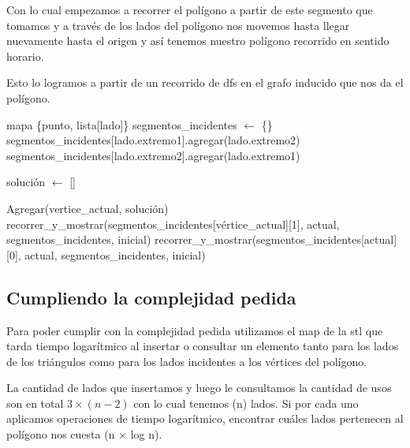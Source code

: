 Con lo cual empezamos a recorrer el polígono a partir de este segmento que tomamos y a través de los lados del polígono nos movemos hasta llegar nuevamente hasta el origen y así tenemos nuestro polígono recorrido en sentido horario.\newline    

Esto lo logramos a partir de un recorrido de dfs en el grafo inducido que nos da el polígono.\newline

\begin{algorithmic}

	\State mapa \{punto, lista[lado]\} segmentos_incidentes $\gets$ \{\}
		\State segmentos_incidentes[lado.extremo1].agregar(lado.extremo2)
		\State segmentos_incidentes[lado.extremo2].agregar(lado.extremo1)
	\EndFor 
\EndFunction
\end{algorithmic}


\begin{algorithmic}
\State solución $\gets$ []

	\State Agregar(vertice_actual, solución)
			\State recorrer_y_mostrar(segmentos_incidentes[vértice_actual][1], actual, segmentos_incidentes, inicial)
		\EndIf
	\Else
			\State recorrer_y_mostrar(segmentos_incidentes[actual][0], actual, segmentos_incidentes, inicial)
		\EndIf
	\EndIf
\EndFunction

\end{algorithmic}

\subsection{Cumpliendo la complejidad pedida}
Para poder cumplir con la complejidad pedida utilizamos el map de la stl que tarda tiempo logarítmico al insertar o consultar un elemento tanto para los lados de los triángulos como para los lados incidentes a los vértices del polígono.\newline

La cantidad de lados que insertamos y luego le consultamos la cantidad de usos son en total $3 \times (n-2)$ con lo cual tenemos \bigo(n) lados. Si por cada uno aplicamos operaciones de tiempo logarítmico, encontrar cuáles lados pertenecen al polígono nos cuesta \bigo(n $\times$ log n).\newline

